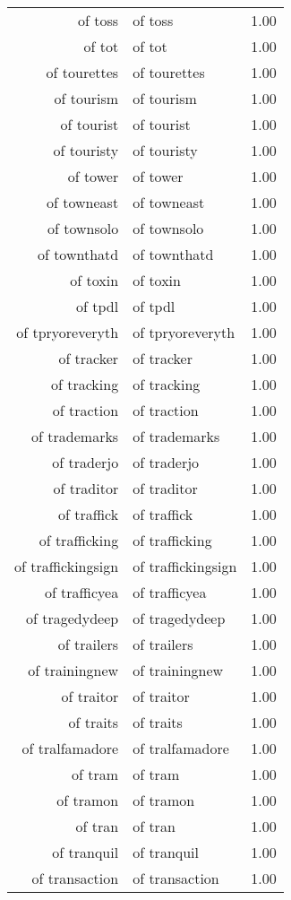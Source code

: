 \begin{table}[ht]
\begin{tabular}{rlr}
  of toss & of toss & 1.00 \\ 
  of tot & of tot & 1.00 \\ 
  of tourettes & of tourettes & 1.00 \\ 
  of tourism & of tourism & 1.00 \\ 
  of tourist & of tourist & 1.00 \\ 
  of touristy & of touristy & 1.00 \\ 
  of tower & of tower & 1.00 \\ 
  of towneast & of towneast & 1.00 \\ 
  of townsolo & of townsolo & 1.00 \\ 
  of townthatd & of townthatd & 1.00 \\ 
  of toxin & of toxin & 1.00 \\ 
  of tpdl & of tpdl & 1.00 \\ 
  of tpryoreveryth & of tpryoreveryth & 1.00 \\ 
  of tracker & of tracker & 1.00 \\ 
  of tracking & of tracking & 1.00 \\ 
  of traction & of traction & 1.00 \\ 
  of trademarks & of trademarks & 1.00 \\ 
  of traderjo & of traderjo & 1.00 \\ 
  of traditor & of traditor & 1.00 \\ 
  of traffick & of traffick & 1.00 \\ 
  of trafficking & of trafficking & 1.00 \\ 
  of traffickingsign & of traffickingsign & 1.00 \\ 
  of trafficyea & of trafficyea & 1.00 \\ 
  of tragedydeep & of tragedydeep & 1.00 \\ 
  of trailers & of trailers & 1.00 \\ 
  of trainingnew & of trainingnew & 1.00 \\ 
  of traitor & of traitor & 1.00 \\ 
  of traits & of traits & 1.00 \\ 
  of tralfamadore & of tralfamadore & 1.00 \\ 
  of tram & of tram & 1.00 \\ 
  of tramon & of tramon & 1.00 \\ 
  of tran & of tran & 1.00 \\ 
  of tranquil & of tranquil & 1.00 \\ 
  of transaction & of transaction & 1.00 \\ 

\end{tabular}
\end{table}
